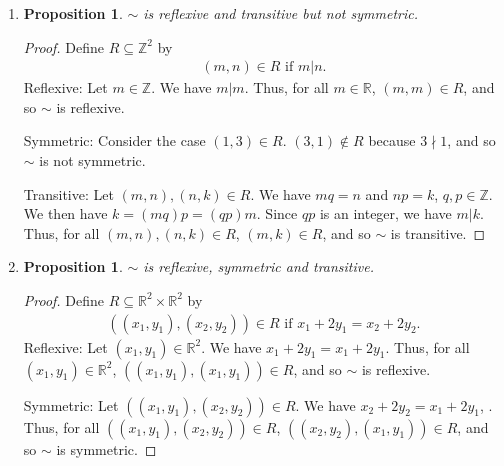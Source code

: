 \documentclass{article}
\newtheorem{prop}[thm]{Proposition}
\begin{document}
\begin{enumerate}
\begin{enumerate}
\begin{proof}
        Symmetric: Let $(x, y) \in R$. We have $|y - x| = |x - y| \leq 2$. Thus, for all $(x, y) \in R$, $(y,x) \in R$, and so $\sim$ is symmetric.

        Transitive: Consider the case $(4, 2), (2, 0) \in R$. $(4, 0) \notin R$ because $|4 - 0| = 4 > 2$, and so $\sim$ is not transitive.
    \end{proof}

    \item \begin{prop}
        $\sim$ is reflexive and transitive but not symmetric.
    \end{prop}
    \begin{proof}
        Define $R \subseteq \mathbb{Z}^2$ by
        \begin{gather}
            (m, n) \in R \text{ if } m|n.
        \end{gather}
        Reflexive: Let $m \in \mathbb{Z}$. We have $m|m$. Thus, for all $m \in \mathbb{R}$, $(m,m) \in R$, and so $\sim$ is reflexive.

        Symmetric: Consider the case $(1, 3) \in R$. $(3, 1) \notin R$ because $3 \nmid 1$, and so $\sim$ is not symmetric.

        Transitive: Let $(m, n), (n, k) \in R$. We have $mq = n$ and $np = k$, $q, p \in \mathbb{Z}$. We then have $k = (mq)p = (qp)m$. Since $qp$ is an integer, we have $m|k$. Thus, for all $(m, n), (n, k) \in R$, $(m,k) \in R$, and so $\sim$ is transitive.
    \end{proof}

    \item \begin{prop}
        $\sim$ is reflexive, symmetric and transitive.
    \end{prop}
    \begin{proof}
        Define $R \subseteq \mathbb{R}^2 \times \mathbb{R}^2$ by
        \begin{gather}
            ((x_1, y_1), (x_2, y_2)) \in R \text{ if } x_1 + 2y_1 = x_2 + 2y_2.
        \end{gather}
        Reflexive: Let $(x_1, y_1) \in \mathbb{R}^2$. We have $x_1 + 2y_1 = x_1 + 2y_1$. Thus, for all $(x_1, y_1) \in \mathbb{R}^2$, $((x_1, y_1), (x_1, y_1)) \in R$, and so $\sim$ is reflexive.

        Symmetric: Let $((x_1, y_1), (x_2, y_2)) \in R$. We have $x_2 + 2y_2 = x_1+ 2y_1$, . Thus, for all $((x_1, y_1), (x_2, y_2)) \in R$, $((x_2, y_2), (x_1, y_1)) \in R$, and so $\sim$ is symmetric.


\end{proof}
\end{enumerate}
\end{enumerate}
\end{document}
